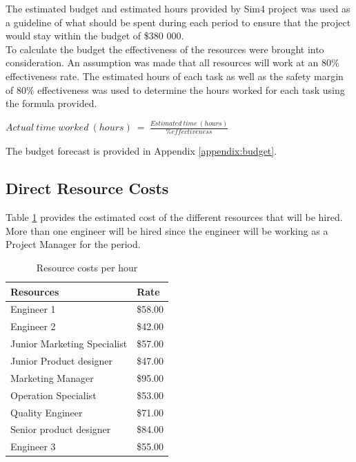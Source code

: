 The estimated budget and estimated hours provided by Sim4 project was used as a guideline of what should be spent during each period to ensure that the project would stay within the budget of \$380 000.\\

\noindent
To calculate the budget the effectiveness of the resources were brought into consideration. An assumption was made that all resources will work at an 80\% effectiveness rate. The estimated hours of each task as well as the safety margin of 80\% effectiveness was used to determine the hours worked for each task using the formula provided.\\

\begin{center}
$ Actual\ time\ worked\ (hours)\ =\ \frac{Estimated\ time\ (hours)}{\% effectiveness} $
\end{center}

The budget forecast is provided in Appendix \ref{appendix:budget}.

\subsection{Direct Resource Costs}

Table \ref{tab:resourcecosts} provides the estimated cost of the different resources that will be hired. More than one engineer will be hired since the engineer will be working as a Project Manager for the period.

\begin{table}[]
\centering
\caption{Resource costs per hour}
\label{tab:resourcecosts}
\begin{tabular}{ll}
\textbf{Resources}          & \textbf{Rate} \\\hline
Engineer 1                  & \$58.00       \\
Engineer 2                  & \$42.00       \\
Junior Marketing Specialist & \$57.00       \\
Junior Product designer     & \$47.00       \\
Marketing Manager           & \$95.00       \\
Operation Specialist        & \$53.00       \\
Quality Engineer            & \$71.00       \\
Senior product designer     & \$84.00       \\
Engineer 3                  & \$55.00      
\end{tabular}
\end{table}

